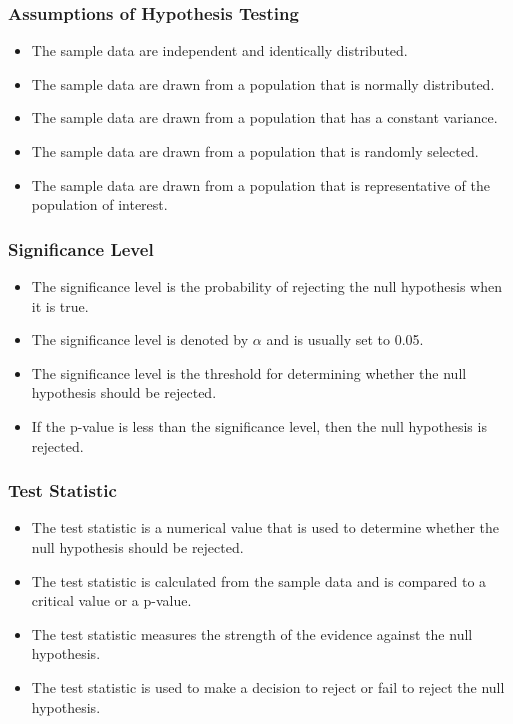 \documentclass[serif, 9pt, aspectratio=32]{beamer}
\begin{document}
\begin{frame}
    \frametitle{Assumptions of Hypothesis Testing}
    \begin{itemize}
        \setlength{\itemsep}{2em}
        \item The sample data are independent and identically distributed.
        \item The sample data are drawn from a population that is normally distributed.
        \item The sample data are drawn from a population that has a constant variance.
        \item The sample data are drawn from a population that is randomly selected.
        \item The sample data are drawn from a population that is representative of the population of interest.
    \end{itemize}
\end{frame}

\begin{frame}
    \frametitle{Significance Level}
    \begin{itemize}
        \setlength{\itemsep}{2em}
        \item The significance level is the probability of rejecting the null hypothesis when it is true.
        \item The significance level is denoted by $\alpha$ and is usually set to 0.05.
        \item The significance level is the threshold for determining whether the null hypothesis should be rejected.
        \item If the p-value is less than the significance level, then the null hypothesis is rejected.
    \end{itemize}
\end{frame}

\begin{frame}
    \frametitle{Test Statistic}
    \begin{itemize}
        \setlength{\itemsep}{2em}
        \item The test statistic is a numerical value that is used to determine whether the null hypothesis should be rejected.
        \item The test statistic is calculated from the sample data and is compared to a critical value or a p-value.
        \item The test statistic measures the strength of the evidence against the null hypothesis.
        \item The test statistic is used to make a decision to reject or fail to reject the null hypothesis.
    \end{itemize}
\end{frame}
\end{document}
